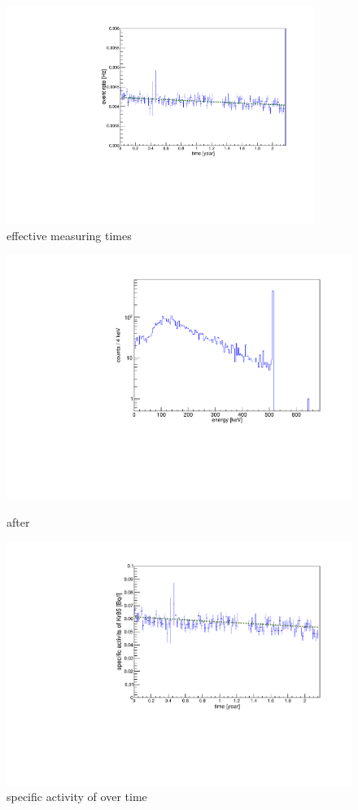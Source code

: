\documentclass[encoding=utf8,british]{tumphthesis}
\begin{document}
\begin{figure}[t!]
	\centering
	\ifmakefigures%
	\includegraphics[width=100mm]{./Bilder/eventRateFit.pdf}
	\fi%
	\caption{effective measuring times}
	\label{fig:ChangeInEventRateFit}
\end{figure}%
\begin{figure}[t!]
	\centering
	\begin{minipage}{.5\textwidth}
		\centering
		\includegraphics[width=\textwidth]{./Bilder/Sim1Phasenraum.pdf}
		\caption{after}
		\label{fig:Sim1Spektrum}
	\end{minipage}%
	\begin{minipage}{.5\textwidth}
		\centering
		\includegraphics[width=\textwidth]{./Bilder/Aktivitaet.pdf}
		\caption{specific activity of \Kr over time}
		\label{fig:activity}
	\end{minipage}
\end{figure}
\end{document}
